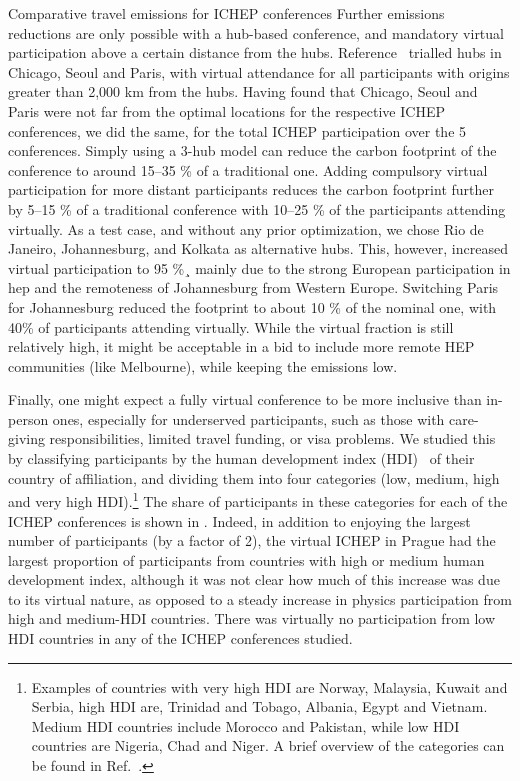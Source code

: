 \documentclass[../SustainableHEP.tex]{subfiles}
\begin{document}
\begin{casestudy}{Comparative travel emissions for ICHEP conferences}
Further emissions reductions are only possible with a hub-based conference, and mandatory virtual participation above a certain distance from the hubs. Reference~\cite{RefAGU} trialled hubs in Chicago, Seoul and Paris, with virtual attendance for all participants with origins greater than 2,000 km from the hubs.  Having found that Chicago, Seoul and Paris were not far from the optimal locations for the respective ICHEP conferences, we did the same, for the total ICHEP participation over the 5 conferences.  Simply using a 3-hub model can reduce the carbon footprint of the conference to around 15--35 \% of a traditional one.  Adding compulsory virtual participation for more distant participants reduces the carbon footprint further by 5--15 \% of a traditional conference with 10--25 \% of the participants attending virtually.  As a test case, and without any prior optimization, we chose Rio de Janeiro, Johannesburg, and Kolkata as alternative hubs. This, however, increased virtual participation to 95 \%¸ mainly due to the strong European participation in \acrshort{hep} and the remoteness of Johannesburg from Western Europe. Switching Paris for Johannesburg reduced the footprint to about 10 \% of the nominal one, with 40\% of participants attending virtually. While the virtual fraction is still relatively high, it might be acceptable in a bid to include more remote HEP communities (like Melbourne), while keeping the emissions low.

Finally, one might expect a fully virtual conference to be more inclusive than in-person ones, especially for underserved participants, such as those with care-giving responsibilities, limited travel funding, or visa problems.  We studied this by classifying participants by the human development index (HDI)~\cite{hdiref} of their country of affiliation, and dividing them into four categories (low, medium, high and very high HDI).\footnote{Examples of countries with very high HDI are Norway,  Malaysia, Kuwait and Serbia, high HDI are, \eg Trinidad and Tobago, Albania, Egypt and Vietnam. Medium HDI countries include Morocco and Pakistan, while low HDI countries are \eg Nigeria, Chad and Niger. A brief overview of the categories can be found in Ref.~\cite{hdiref}.}  The share of participants in these categories for each of the ICHEP conferences is shown in . Indeed, in addition to enjoying the largest number of participants (by a factor of 2), the virtual ICHEP in Prague had the largest proportion of participants from countries with high or medium human development index, although it was not clear how much of this increase was due to its virtual nature, as opposed to a steady increase in physics participation from high and medium-HDI countries.  There was virtually no participation from low HDI countries in any of the ICHEP conferences studied.


\end{casestudy}
\end{document}
